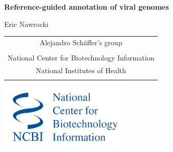 \documentclass[landscape]{slides}
\begin{document}
\begin{slide}
\begin{center}
\large{\textbf{Reference-guided annotation of viral genomes}}

\normalsize

Eric Nawrocki \\

\medskip

\medskip

\medskip

\medskip

\medskip

\small
\begin{tabular}{c}
Alejandro Sch\"{a}ffer's group \\
\\
National Center for Biotechnology Information\\
National Institutes of Health\\
\\
\end{tabular}

\vspace{0.1in}

\includegraphics[width=2.5in]{figs/ncbi-logo}

\end{center}
\end{slide}
\end{document}
